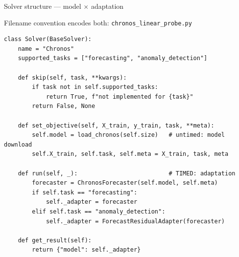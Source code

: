 \documentclass{beamer}
\begin{document}
\begin{frame}[fragile]{Solver structure --- model $\times$ adaptation}

    Filename convention encodes both: \texttt{chronos\_linear\_probe.py}

    \begin{lstlisting}
class Solver(BaseSolver):
    name = "Chronos"
    supported_tasks = ["forecasting", "anomaly_detection"]

    def skip(self, task, **kwargs):
        if task not in self.supported_tasks:
            return True, f"not implemented for {task}"
        return False, None

    def set_objective(self, X_train, y_train, task, **meta):
        self.model = load_chronos(self.size)   # untimed: model download
        self.X_train, self.task, self.meta = X_train, task, meta

    def run(self, _):                          # TIMED: adaptation
        forecaster = ChronosForecaster(self.model, self.meta)
        if self.task == "forecasting":
            self._adapter = forecaster
        elif self.task == "anomaly_detection":
            self._adapter = ForecastResidualAdapter(forecaster)

    def get_result(self):
        return {"model": self._adapter}
    \end{lstlisting}

\end{frame}
\end{document}
